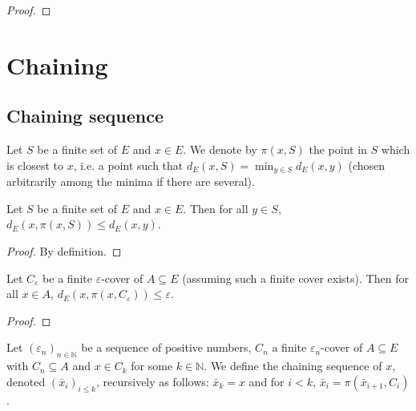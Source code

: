\begin{proof}

\end{proof}


\section{Chaining}

\subsection{Chaining sequence}


\begin{definition}\label{def:nearestPt}
  \leanok
Let $S$ be a finite set of $E$ and $x \in E$.
We denote by $\pi(x, S)$ the point in $S$ which is closest to $x$, i.e. a point such that $d_E(x, S) = \min_{y \in S} d_E(x, y)$ (chosen arbitrarily among the minima if there are several).
\end{definition}


\begin{lemma}\label{lem:dist_nearestPt_le}
  \leanok
Let $S$ be a finite set of $E$ and $x \in E$.
Then for all $y \in S$, $d_E(x, \pi(x, S)) \le d_E(x, y)$.
\end{lemma}

\begin{proof}\leanok
By definition.
\end{proof}


\begin{lemma}\label{lem:dist_nearestPt_of_isCover}
  \leanok
Let $C_\varepsilon$ be a finite $\varepsilon$-cover of $A \subseteq E$ (assuming such a finite cover exists).
Then for all $x \in A$, $d_E(x, \pi(x, C_\varepsilon)) \le \varepsilon$.
\end{lemma}

\begin{proof}\leanok

\end{proof}


\begin{definition}\label{def:chainingSequence}
  \leanok
Let $(\varepsilon_n)_{n \in \mathbb{N}}$ be a sequence of positive numbers, $C_n$ a finite $\varepsilon_n$-cover of $A \subseteq E$ with $C_n \subseteq A$ and $x \in C_k$ for some $k \in \mathbb{N}$.
We define the chaining sequence of $x$, denoted $(\bar{x}_i)_{i \le k}$, recursively as follows: $\bar{x}_k = x$ and for $i < k$, $\bar{x}_i = \pi(\bar{x}_{i+1}, C_i)$.
\end{definition}


